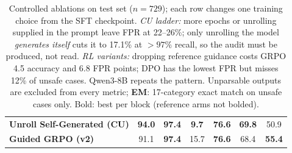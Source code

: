 \begin{table}[t]
{\begin{tabular}{@{}lcccccc@{}}
\quad \textbf{Unroll Self-Generated (CU)} & \textbf{94.0} & \textbf{97.4} & \textbf{9.7} & \textbf{76.6} & \textbf{69.8} & 50.9 \\
\quad \textbf{Guided GRPO (v2)} & 91.1 & \textbf{97.4} & 15.7 & \textbf{76.6} & 68.4 & \textbf{55.4} \\
\bottomrule
\end{tabular}%
}
\caption{Controlled ablations on test set ($n{=}729$); each row changes one training choice from the SFT
checkpoint. \textit{CU ladder:} more epochs or unrolling supplied in the prompt leave FPR at 22--26\%; only
unrolling the model \textit{generates itself} cuts it to 17.1\% at ${>}97\%$ recall, so the audit must be
produced, not read. \textit{RL variants:} dropping reference guidance costs GRPO 4.5 accuracy and 6.8 FPR
points; DPO has the lowest FPR but misses 12\% of unsafe cases. Qwen3-8B repeats the pattern. Unparsable
outputs are excluded from every metric; \textbf{EM}: 17-category exact match on unsafe cases only. Bold: best
per block (reference arms not bolded).}
\label{tab:ablations}
\end{table}
